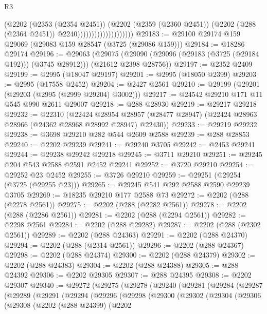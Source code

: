 \begin{lexlean}{R3}
\begin{coremodule}
                                      (@2202
                                        (@2353 (@2354 @2451))
                                        (@2202
                                          (@2359 (@2360 @2451))
                                          (@2202 (@288 (@2364 @2451)) @2240))))))))))))))))))))
@29183 := @29100 @29174 @159 @29069 (@29083 @159 @28547 (@3725 (@29086 @159)))
@29184 := @18286 @29174
@29196 := @29063
    (@29075 (@29090 (@29096 (@29183 (@3725 (@29184 @192))) (@3745 @28912))) (@21612 @2398 @28756))
@29197 := @2352 @2409
@29199 := @2995 (@18047 @29197)
@29201 := @2995 (@18050 @2399)
@29203 := @2995 (@17558 @2452)
@29204 := @2427 @2561
@29210 := @29199 (@29201 (@29203 (@2995 (@2999 @29204) @3002)))
@29217 := @24542 @29210 @171 @11 @545 @990 @2611 @29007
@29218 := @288 @28930
@29219 := @29217 @29218
@29232 := @22310
    (@22424
      @28954
      @28957
      (@28477 @28947)
      (@22424 @28963 @28966 (@24362 @28968 @28992 @28947) @22430))
@29233 := @29219 @29232
@29238 := @3698 @29210 @282 @544 @2609 @2588
@29239 := @288 @28853
@29240 := @2202 @29239
@29241 := @29240 @3705
@29242 := @2453 @29241
@29244 := @29238 @29242 @29218
@29245 := @3711 @29210
@29251 := @29245 @204 @543 @2588 @2591 @2452 @29241
@29252 := @3720 @29210
@29254 := @29252 @23 @2452
@29255 := @3726 @29210
@29259 := @29251 (@29254 (@3725 (@29255 @23)))
@29265 := @29245 @541 @292 @2588 @2590 @29239 @3705
@29269 := @18235 @29210 @177 @2588 @73
@29272 := @2202 (@288 (@2278 @2561))
@29275 := @2202 (@288 (@2282 @2561))
@29278 := @2202 (@288 (@2286 @2561))
@29281 := @2202 (@288 (@2294 @2561))
@29282 := @2298 @2561
@29284 := @2202 (@288 @29282)
@29287 := @2202 (@288 (@2302 @2561))
@29289 := @2202 (@288 @24363)
@29291 := @2202 (@288 @24370)
@29294 := @2202 (@288 (@2314 @2561))
@29296 := @2202 (@288 @24367)
@29298 := @2202 (@288 @24374)
@29300 := @2202 (@288 @24379)
@29302 := @2202 (@288 @24383)
@29304 := @2202 (@288 @24388)
@29305 := @288 @24392
@29306 := @2202 @29305
@29307 := @288 @24395
@29308 := @2202 @29307
@29340 := @29272
    (@29275
      (@29278
        (@29240
          (@29281
            (@29284
              (@29287
                (@29289
                  (@29291
                    (@29294
                      (@29296
                        (@29298
                          (@29300
                            (@29302
                              (@29304
                                (@29306
                                  (@29308
                                    (@2202
                                      (@288 @24399)
                                      (@2202

\end{coremodule}
\end{lexlean}

